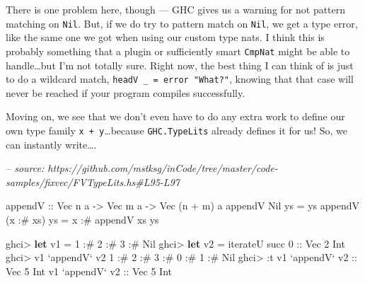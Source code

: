 \documentclass[]{article}
\newenvironment{Shaded}{}{}
\newcommand{\CommentTok}[1]{\textcolor[rgb]{0.38,0.63,0.69}{\textit{#1}}}
\newcommand{\DataTypeTok}[1]{\textcolor[rgb]{0.56,0.13,0.00}{#1}}
\newcommand{\DecValTok}[1]{\textcolor[rgb]{0.25,0.63,0.44}{#1}}
\newcommand{\FunctionTok}[1]{\textcolor[rgb]{0.02,0.16,0.49}{#1}}
\newcommand{\KeywordTok}[1]{\textcolor[rgb]{0.00,0.44,0.13}{\textbf{#1}}}
\newcommand{\NormalTok}[1]{#1}
\newcommand{\OtherTok}[1]{\textcolor[rgb]{0.00,0.44,0.13}{#1}}
\begin{document}
There is one problem here, though --- GHC gives us a warning for not pattern
matching on \texttt{Nil}. But, if we do try to pattern match on \texttt{Nil}, we
get a type error, like the same one we got when using our custom type nats. I
think this is probably something that a plugin or sufficiently smart
\texttt{CmpNat} might be able to handle\ldots{}but I'm not totally sure. Right
now, the best thing I can think of is just to do a wildcard match,
\texttt{headV\ \_\ =\ error\ "What?"}, knowing that that case will never be
reached if your program compiles successfully.

Moving on, we see that we don't even have to do any extra work to define our own
type family \texttt{x\ +\ y}\ldots{}because \texttt{GHC.TypeLits} already
defines it for us! So, we can instantly write\ldots{}.

\begin{Shaded}
\begin{Highlighting}[]
\CommentTok{-- source: https://github.com/mstksg/inCode/tree/master/code-samples/fixvec/FVTypeLits.hs#L95-L97}

\OtherTok{appendV ::} \DataTypeTok{Vec}\NormalTok{ n a }\OtherTok{->} \DataTypeTok{Vec}\NormalTok{ m a }\OtherTok{->} \DataTypeTok{Vec}\NormalTok{ (n }\FunctionTok{+}\NormalTok{ m) a}
\NormalTok{appendV }\DataTypeTok{Nil}\NormalTok{       ys }\FunctionTok{=}\NormalTok{ ys}
\NormalTok{appendV (x }\FunctionTok{:#}\NormalTok{ xs) ys }\FunctionTok{=}\NormalTok{ x }\FunctionTok{:#}\NormalTok{ appendV xs ys}
\end{Highlighting}
\end{Shaded}

\begin{Shaded}
\begin{Highlighting}[]
\NormalTok{ghci}\FunctionTok{>} \KeywordTok{let}\NormalTok{ v1 }\FunctionTok{=} \DecValTok{1} \FunctionTok{:#} \DecValTok{2} \FunctionTok{:#} \DecValTok{3} \FunctionTok{:#} \DataTypeTok{Nil}
\NormalTok{ghci}\FunctionTok{>} \KeywordTok{let}\NormalTok{ v2 }\FunctionTok{=}\NormalTok{ iterateU succ }\DecValTok{0}\OtherTok{ ::} \DataTypeTok{Vec} \DecValTok{2} \DataTypeTok{Int}
\NormalTok{ghci}\FunctionTok{>}\NormalTok{ v1 }\OtherTok{`appendV`}\NormalTok{ v2}
\DecValTok{1} \FunctionTok{:#} \DecValTok{2} \FunctionTok{:#} \DecValTok{3} \FunctionTok{:#} \DecValTok{0} \FunctionTok{:#} \DecValTok{1} \FunctionTok{:#} \DataTypeTok{Nil}
\NormalTok{ghci}\FunctionTok{>} \FunctionTok{:}\NormalTok{t v1 }\OtherTok{`appendV` v2 ::} \DataTypeTok{Vec} \DecValTok{5} \DataTypeTok{Int}
\NormalTok{v1 }\OtherTok{`appendV` v2 ::} \DataTypeTok{Vec} \DecValTok{5} \DataTypeTok{Int}
\end{Highlighting}
\end{Shaded}
\end{document}

